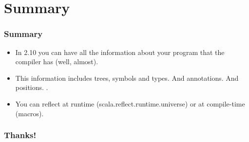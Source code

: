 \documentclass[hyperref={bookmarks=false}]{beamer}
\begin{document}
\section{Summary}

\begin{frame}[fragile]
\frametitle{Summary}

\begin{itemize}
\item In 2.10 you can have all the information about your program that the compiler has (well, almost).
\item This information includes trees, symbols and types. And annotations. And positions.
.
\item You can reflect at runtime (scala.reflect.runtime.universe) or at compile-time (macros).
\end{itemize}
\end{frame}


\begin{frame}[fragile]
\frametitle{Thanks!}

\centering
{}

\end{frame}
\end{document}
